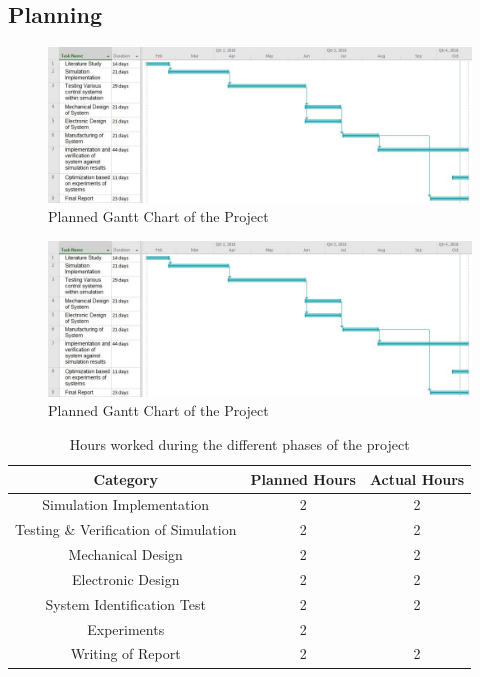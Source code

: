 \subsection{Planning}

\begin{figure}[h]
	\centering
	\includegraphics[scale=0.5]{./figs/planning_gantt/ganttchart.jpg}
	\caption{Planned Gantt Chart of the Project}
	\label{fig:planned_ganttchart}
\end{figure}

\begin{figure}[h]
	\centering
	\includegraphics[scale=0.5]{./figs/planning_gantt/ganttchart.jpg}
	\caption{Planned Gantt Chart of the Project}
	\label{fig:actual_ganttchart}
\end{figure}

\begin{table}[h]
	\centering
	\begin{tabular}{|c|c|c|}
		\hline
		Category & Planned Hours & Actual Hours \\
		\hline
		\hline
		Simulation Implementation & 2 & 2 \\
		\hline
		Testing \& Verification of Simulation & 2 & 2 \\
		\hline 
		Mechanical Design  & 2 & 2 \\
		\hline
		Electronic Design & 2 & 2 \\
		\hline
		System Identification Test & 2 & 2 \\
		\hline
		Experiments & 2 & \\
		\hline
		Writing of Report & 2 & 2 \\
		\hline
		
	\end{tabular}
	\caption{Hours worked during the different phases of the project}
	\label{table:hours_worked}
	
\end{table}

